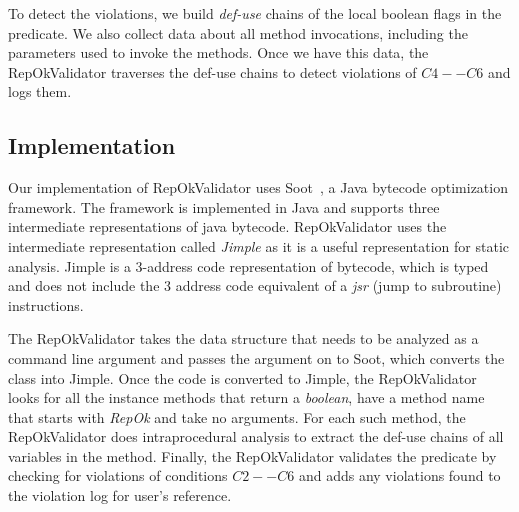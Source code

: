 
\para To detect the violations, we build \emph{def-use} chains of the
local boolean flags in the predicate. We also collect data about all
method invocations, including the parameters used to invoke the
methods. Once we have this data, the RepOkValidator traverses the
def-use chains to detect violations of $C4--C6$ and logs them.

\subsection{Implementation}
\label{sec:implementation}
Our implementation of RepOkValidator uses Soot~\cite{vallee1999soot},
a Java bytecode optimization framework. The framework is implemented
in Java and supports three intermediate representations of java
bytecode. RepOkValidator uses the intermediate representation called
\emph{Jimple} as it is a useful representation for static analysis.
Jimple is a 3-address code representation of bytecode, which is typed
and does not include the 3 address code equivalent of a \emph{jsr}
(jump to subroutine) instructions.

\para The RepOkValidator takes the data structure that needs to be
analyzed as a command line argument and passes the argument on to
Soot, which converts the class into Jimple. Once the code is converted
to Jimple, the RepOkValidator looks for all the instance methods that
return a \emph{boolean}, have a method name that starts with
\emph{RepOk} and take no arguments. For each such method, the
RepOkValidator does intraprocedural analysis to extract the def-use
chains of all variables in the method. Finally, the RepOkValidator
validates the predicate by checking for violations of conditions
$C2--C6$ and adds any violations found to the violation log for user’s
reference.

